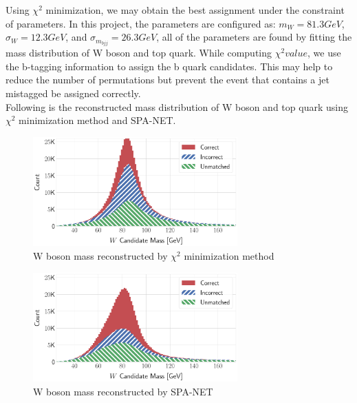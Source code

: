 Using $\chi^{2}$ minimization, we may obtain the best assignment under the constraint of parameters. In this project, the parameters are configured as: $m_{W}=81.3GeV$, $\sigma_{W} = 12.3GeV$, and $\sigma_{m_{bjj}}=26.3GeV$, all of the parameters are found by fitting the mass distribution of W boson and top quark. While computing $\chi^{2} value$, we use the b-tagging information to assign the b quark candidates. This may help to reduce the number of permutations but prevent the event that contains a jet mistagged be assigned correctly.
\\
Following is the reconstructed mass distribution of W boson and top quark using $\chi^{2}$ minimization method and SPA-NET.
\\
\begin{figure}[H]
	\centering
	\includegraphics[width=0.7\textwidth]{Figures/network_w_quark_stacked_chi2.pdf}
	\caption{W boson mass reconstructed by $\chi^{2}$ minimization method}
	\label{fig: chi2 reco Wboson}
\end{figure}
\begin{figure}[H]
	\centering
	\includegraphics[width=0.7\textwidth]{Figures/network_w_quark_stacked.pdf}
	\caption{W boson mass reconstructed by SPA-NET}
	\label{fig: spanet reco Wboson}
\end{figure}

